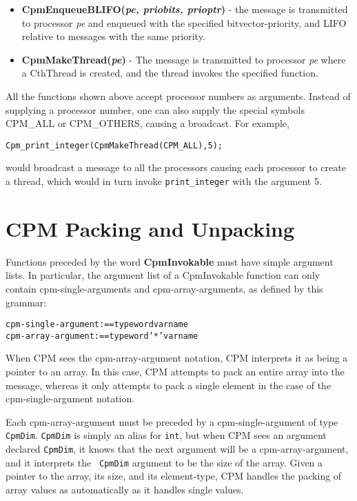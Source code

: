 \begin{itemize}
\item[]{{\bf CpmEnqueueBLIFO({\it pe, priobits, prioptr})} - the
message is transmitted to processor {\it pe} and enqueued with the
specified bitvector-priority, and LIFO relative to messages with the
same priority.}

\item[]{{\bf CpmMakeThread({\it pe})} - The message is transmitted to
processor {\it pe} where a CthThread is created, and the thread
invokes the specified function.}

\end{itemize}

All the functions shown above accept processor numbers as arguments.
Instead of supplying a processor number, one can also supply the
special symbols CPM\_ALL or CPM\_OTHERS, causing a broadcast.  For
example,

\begin{alltt}
Cpm_print_integer(CpmMakeThread(CPM_ALL), 5);
\end{alltt}

would broadcast a message to all the processors causing each processor
to create a thread, which would in turn invoke {\tt print\_integer}
with the argument 5.

\section{CPM Packing and Unpacking}

Functions preceded by the word {\bf CpmInvokable} must have simple
argument lists.  In particular, the argument list of a CpmInvokable
function can only contain cpm-single-arguments and cpm-array-arguments,
as defined by this grammar:

\begin{alltt}
    cpm-single-argument :== typeword varname
    cpm-array-argument  :== typeword '*' varname
\end{alltt}

When CPM sees the cpm-array-argument notation, CPM interprets it as
being a pointer to an array.  In this case, CPM attempts to pack an
entire array into the message, whereas it only attempts to pack a
single element in the case of the cpm-single-argument notation.

Each cpm-array-argument must be preceded by a cpm-single-argument of
type {\tt CpmDim}.  {\tt CpmDim} is simply an alias for {\tt int}, but
when CPM sees an argument declared {\tt CpmDim}, it knows that the
next argument will be a cpm-array-argument, and it interprets the {\tt
CpmDim} argument to be the size of the array.  Given a pointer to the
array, its size, and its element-type, CPM handles the packing of
array values as automatically as it handles single values.

